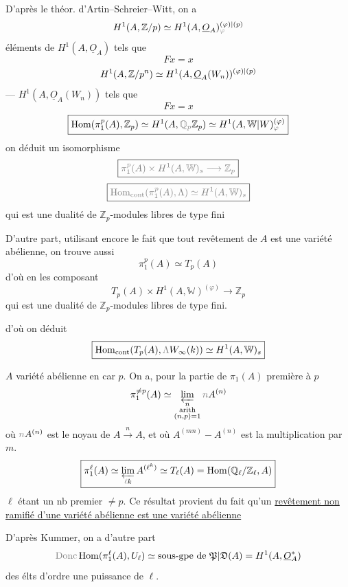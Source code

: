 D'après le théor. d'Artin--Schreier--Witt, on a
\[
H^1(A,\mathbb Z/p)\simeq H^1(A,\underline O_A)^{\unsure{(\varphi)|(p)}}_{\deleted{\unsure{\varphi}}}
\]
éléments de $H^1(A,\underline O_A)$ tels que
\[Fx=x\]
\[
H^1(A,\mathbb Z/p^n)\simeq H^1(A,\underline O_A(W_n))^{(\varphi)|(p)}
\]
--- $H^1(A,\underline O_A(W_n))$ tels que
\[Fx=x\]
\[
\boxed{\operatorname{Hom}(\pi_1^p(A),\mathbb Z_p)\simeq H^1(A,\deleted{\unsure{\mathbb Q_p}}\mathbb Z_p)
\simeq H^1(A,\unsure{\mathbb W|W})^{(\varphi)}_{\deleted{\unsure{\varphi}}}}
\]
  on déduit un  isomorphisme
\[
\boxed{\deleted{\pi_1^p(A)\times H^1(A,\mathbb W)_s\longrightarrow\mathbb Z_p}}
\]
\[
\boxed{\deleted{\operatorname{Hom}_{\mathrm{cont}}(\pi_1^p(A),\Lambda)\simeq H^1(A,\mathbb W)_s}}
\]
qui est une dualité  de $\mathbb Z_p$-modules libres de type fini

D'autre part, utilisant encore le fait que tout revêtement de $A$ est une variété abélienne, on trouve aussi
\[\boxed{\pi_1^p(A)\simeq T_p(A)}\]
d'où en les composant
\[\boxed{T_p(A)\times H^1(A,\mathbb W)^{(\varphi)}\longrightarrow\mathbb Z_p}\]
qui est une dualité de $\mathbb Z_p$-modules libres de type fini.

 d'où on déduit
\[
\boxed{\operatorname{Hom}_{\mathrm{cont}}(T_p(A),\deleted{\unsure{\Lambda}}W_\infty(k))\simeq H^1(A,\mathbb W)_s}
\]

$A$ variété abélienne en car $p$. On a, pour la partie de $\pi_1(A)$ première à $p$
\[
\pi_1^{\neq p}(A)\simeq\varprojlim_{\substack{n\\\text{\unsure{arith}}\\(n,p)=1}}\deleted{\unsure{n}}A^{(n)}
\]
où $\deleted{\unsure{n}}A^{(n)}$ est le noyau de $A\xrightarrow{n}A$, et où $A^{(mn)}\mathbin{-}A^{(n)}$ est la multiplication par $m$.
\[
\boxed{\pi_1^\ell(A)\simeq\varprojlim_{\deleted{\unsure{\ell}}k} A^{(\ell^k)}\simeq T_\ell(A)=\operatorname{Hom}(\mathbb Q_\ell/\mathbb Z_\ell,A)}
\]
$\ell$ étant un nb premier $\neq p$. Ce résultat provient du fait qu'un \uline{revêtement non ramifié d'une variété abélienne est une variété abélienne}

D'après Kummer, on a d'autre part
\[
\deleted{\text{Donc}}\operatorname{Hom}(\pi_1^\ell(A),U_\ell)\simeq
\text{sous-gpe de }\unsure{\mathfrak P|\mathfrak D}(A)=H^1(A,\underline O_A^{\unsure{*}})
\]
des élts d'ordre une puissance de $\ell$.

